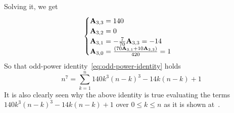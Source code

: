 \begin{examp}
    Solving it, we get
    \begin{equation*}
        \begin{cases}
            {\mathbf{A}} \sb{3,3} = 140 \\
            {\mathbf{A}} \sb{3,2} = 0 \\
            {\mathbf{A}} \sb{3,1} = -\frac{7}{70} {\mathbf{A}} \sb{3,3} = -14 \\
            {\mathbf{A}} \sb{3,0} = \frac{(70 {\mathbf{A}} \sb{3,1} + 10 {\mathbf{A}} \sb{3,3})}{420} = 1
        \end{cases}
    \end{equation*}
    So that odd-power identity~\eqref{eq:odd-power-identity} holds
    \begin{equation*}
        n^7 = \sum_{k=1}^{n} 140 k^3 (n-k)^3 - 14k(n-k) + 1
    \end{equation*}
    It is also clearly seen
    why the above identity is true evaluating the terms $140 k^3 (n-k)^3 - 14k(n-k) + 1$ over $0 \leq k \leq n$ as
    it is shown at~\cite{kolosov2018seventh}.
\end{examp}